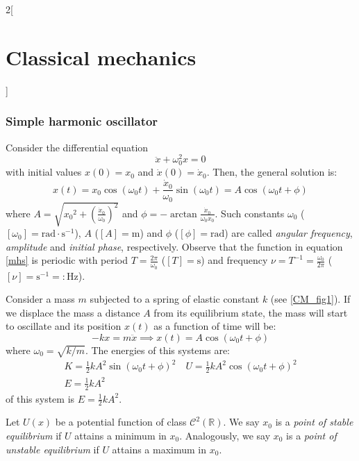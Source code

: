 \documentclass[../../../main.tex]{subfiles}
\begin{document}
\begin{multicols}{2}[\section{Classical mechanics}]
  \subsubsection{Simple harmonic oscillator}
  \begin{prop}
    Consider the differential equation $$\ddot{x}+\omega_0^2 x=0$$ with initial values $x(0)=x_0$ and $\dot{x}(0)=\dot{x}_0$. Then, the general solution is:
    \begin{equation}
      x(t)=x_0\cos(\omega_0t)+\frac{\dot{x}_0}{\omega_0}\sin(\omega_0t)=A\cos(\omega_0t+\phi)
      \label{mhs}
    \end{equation} where $\displaystyle A=\sqrt{{x_0}^2+{\left(\frac{\dot{x}_0}{\omega_0}\right)}^2}$ and $\displaystyle \phi=-\arctan\frac{\dot{x}_0}{\omega_0x_0}$. Such constants $\omega_0$ ($[\omega_0]=\text{rad}\cdot \text{s}^{-1}$), $A$ ($[A]=\text{m}$) and $\phi$ ($[\phi]=\text{rad}$) are called \textit{angular frequency}, \textit{amplitude} and \textit{initial phase}, respectively. Observe that the function in equation \eqref{mhs} is periodic with period $T=\frac{2\pi}{\omega_0}$ ($[T]=\text{s}$) and frequency $\nu=T^{-1}=\frac{\omega_0}{2\pi}$ ($[\nu]=\text{s}^{-1}=:\text{Hz}$).
  \end{prop}
  \begin{prop}
    Consider a mass $m$ subjected to a spring of elastic constant $k$ (see \cref{CM_fig1}). If we displace the mass a distance $A$ from its equilibrium state, the mass will start to oscillate and its position $x(t)$ as a function of time will be:
    $$-kx=m\ddot{x}\implies x(t)=A\cos(\omega_0t+\phi)$$ where $\omega_0=\sqrt{k/m}$. The energies of this systems are:
    \begin{gather*}
      K=\frac{1}{2}kA^2\sin(\omega_0 t+\phi)^2\quad U=\frac{1}{2}kA^2\cos(\omega_0 t+\phi)^2\\
      E=\frac{1}{2}kA^2
    \end{gather*}
    of this system is $E=\frac{1}{2}kA^2$.
    \begin{center}
      \begin{minipage}{\linewidth}
        \centering
        
        \label{CM_fig1}
      \end{minipage}
    \end{center}
  \end{prop}
  \begin{definition}
    Let $U(x)$ be a potential function of class $\mathcal{C}^2(\mathbb{R})$. We say $x_0$ is a \textit{point of stable equilibrium} if $U$ attains a minimum in $x_0$. Analogously, we say $x_0$ is a \textit{point of unstable equilibrium} if $U$ attains a maximum in $x_0$.

\end{definition}
\end{multicols}
\end{document}
